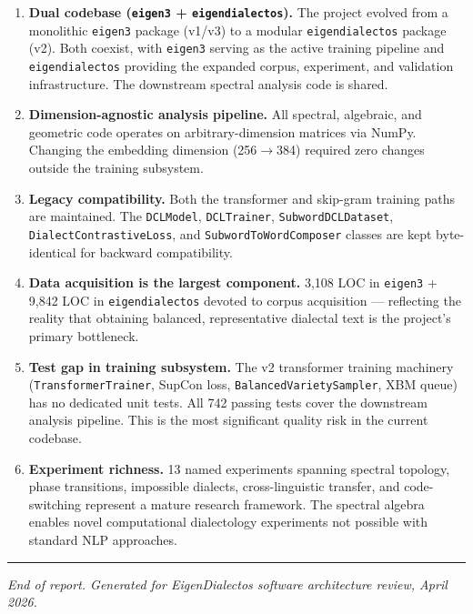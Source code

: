 \documentclass[11pt,a4paper]{article}
\begin{document}
\begin{enumerate}
  \item \textbf{Dual codebase (\texttt{eigen3} + \texttt{eigendialectos}).}
    The project evolved from a monolithic \texttt{eigen3} package (v1/v3) to a
    modular \texttt{eigendialectos} package (v2). Both coexist, with \texttt{eigen3}
    serving as the active training pipeline and \texttt{eigendialectos} providing
    the expanded corpus, experiment, and validation infrastructure. The downstream
    spectral analysis code is shared.

  \item \textbf{Dimension-agnostic analysis pipeline.}
    All spectral, algebraic, and geometric code operates on arbitrary-dimension
    matrices via NumPy. Changing the embedding dimension (256$\to$384) required
    zero changes outside the training subsystem.

  \item \textbf{Legacy compatibility.}
    Both the transformer and skip-gram training paths are maintained. The
    \texttt{DCLModel}, \texttt{DCLTrainer}, \texttt{SubwordDCLDataset},
    \texttt{DialectContrastiveLoss}, and \texttt{SubwordToWordComposer} classes
    are kept byte-identical for backward compatibility.

  \item \textbf{Data acquisition is the largest component.}
    3{,}108 LOC in \texttt{eigen3} + 9{,}842 LOC in \texttt{eigendialectos}
    devoted to corpus acquisition --- reflecting the reality that obtaining
    balanced, representative dialectal text is the project's primary bottleneck.

  \item \textbf{Test gap in training subsystem.}
    The v2 transformer training machinery (\texttt{TransformerTrainer}, SupCon loss,
    \texttt{BalancedVarietySampler}, XBM queue) has no dedicated unit tests. All 742
    passing tests cover the downstream analysis pipeline. This is the most
    significant quality risk in the current codebase.

  \item \textbf{Experiment richness.}
    13 named experiments spanning spectral topology, phase transitions, impossible
    dialects, cross-linguistic transfer, and code-switching represent a mature
    research framework. The spectral algebra enables novel computational
    dialectology experiments not possible with standard NLP approaches.
\end{enumerate}

\vspace{1em}
\hrule
\vspace{0.5em}
{\small\textit{End of report. Generated for EigenDialectos software architecture review, April 2026.}}
\end{document}
